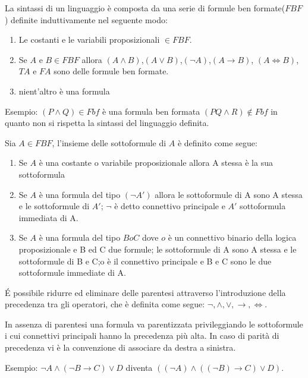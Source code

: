 La sintassi di un linguaggio è composta da una serie di formule ben formate($FBF$) definite
induttivamente nel seguente modo:
\begin{enumerate}
  \item Le costanti e le variabili proposizionali $\in FBF$.
  \item Se $A$ e $B \in FBF$ allora $(A \land B)$,$(A \lor B)$,$(\neg A)$,$(A \rightarrow B)$,
        $(A \iff B)$,$TA$ e $FA$ sono delle formule ben formate.
  \item nient'altro è una formula
\end{enumerate}

Esempio:\newline
$(P \land Q) \in Fbf$  è una formula ben formata\newline
$(PQ \land R) \not \in Fbf$ in quanto non si rispetta la sintassi del linguaggio definita.\newline

Sia $A \in FBF$, l'insieme delle sottoformule di $A$ è definito come segue:
\begin{enumerate}
\item Se $A$ è una costante o variabile proposizionale allora A stessa è la sua sottoformula
\item Se $A$ è una formula del tipo $(\neg A')$ allora le sottoformule di A sono A stessa e le sottoformule di $A'$;
      $\neg$ è detto connettivo principale e $A'$ sottoformula immediata di A.
\item Se $A$ è una formula del tipo $B o C$ dove $o$ è un connettivo binario della logica proposizionale e B ed C due formule;
      le sottoformule di A sono A stessa e le sottoformule di B e C;o è il connettivo principale e B e C sono le due sottoformule immediate di A.
\end{enumerate}


É possibile ridurre ed eliminare delle parentesi attraverso l'introduzione della
precedenza tra gli operatori, che è definita come segue:\newline
$\neg, \land, \lor, \rightarrow,\iff$.

In assenza di parentesi una formula va parentizzata privileggiando le sottoformule
i cui connettivi principali hanno la precedenza più alta.\newline
In caso di parità di precedenza vi è la convenzione di associare da destra a sinistra.

Esempio:\newline
$\neg A \land (\neg B \rightarrow C) \lor D$ diventa
$((\neg A) \land ((\neg B) \rightarrow C) \lor D)$.

